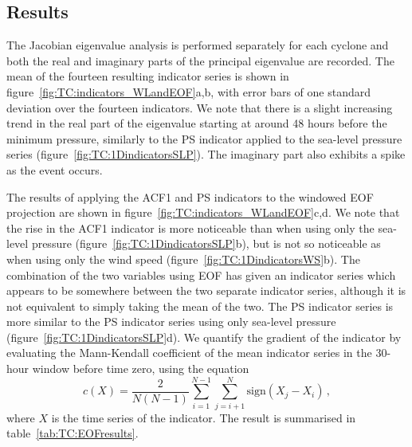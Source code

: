 \subsection{Results}
\label{subsec:TC:2Dresults}

The Jacobian eigenvalue analysis is performed separately for each cyclone and both the real and imaginary parts of the principal eigenvalue are recorded. The mean of the fourteen resulting indicator series is shown in figure~\ref{fig:TC:indicators_WLandEOF}a,b, with error bars of one standard deviation over the fourteen indicators. We note that there is a slight increasing trend in the real part of the eigenvalue starting at around 48 hours before the minimum pressure, similarly to the PS indicator applied to the sea-level pressure series (figure~\ref{fig:TC:1DindicatorsSLP}). The imaginary part also exhibits a spike as the event occurs. 

The results of applying the ACF1 and PS indicators to the windowed EOF projection are shown in figure~\ref{fig:TC:indicators_WLandEOF}c,d. We note that the rise in the ACF1 indicator is more noticeable than when using only the sea-level pressure (figure~\ref{fig:TC:1DindicatorsSLP}b), but is not so noticeable as when using only the wind speed (figure~\ref{fig:TC:1DindicatorsWS}b). The combination of the two variables using EOF has given an indicator series which appears to be somewhere between the two separate indicator series, although it is not equivalent to simply taking the mean of the two. The PS indicator series is more similar to the PS indicator series using only sea-level pressure (figure~\ref{fig:TC:1DindicatorsSLP}d). We quantify the gradient of the indicator by evaluating the Mann-Kendall coefficient of the mean indicator series in the 30-hour window before time zero, using the equation
\begin{equation}
	c(X) = \frac{2}{N(N-1)}\sum_{i=1}^{N-1}\sum_{j=i+1}^{N}\text{sign}(X_j-X_i)\,,
	\label{eqn:TC:MannKendall}
\end{equation} 
where $X$ is the time series of the indicator. The result is summarised in table~\ref{tab:TC:EOFresults}.

